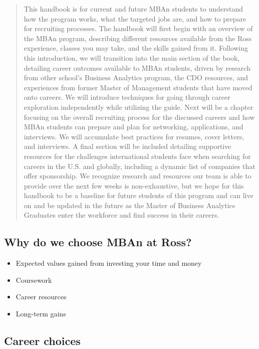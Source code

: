 \documentclass[
]{book}
\providecommand{\tightlist}{%
  \setlength{\itemsep}{0pt}\setlength{\parskip}{0pt}}
\begin{document}
\begin{quote}
This handbook is for current and future MBAn students to understand how the program works, what the targeted jobs are, and how to prepare for recruiting processes. The handbook will first begin with an overview of the MBAn program, describing different resources available from the Ross experience, classes you may take, and the skills gained from it. Following this introduction, we will transition into the main section of the book, detailing career outcomes available to MBAn students, driven by research from other school's Business Analytics program, the CDO resources, and experiences from former Master of Management students that have moved onto careers. We will introduce techniques for going through career exploration independently while utilizing the guide. Next will be a chapter focusing on the overall recruiting process for the discussed careers and how MBAn students can prepare and plan for networking, applications, and interviews. We will accumulate best practices for resumes, cover letters, and interviews. A final section will be included detailing supportive resources for the challenges international students face when searching for careers in the U.S. and globally, including a dynamic list of companies that offer sponsorship. We recognize research and resources our team is able to provide over the next few weeks is non-exhaustive, but we hope for this handbook to be a baseline for future students of this program and can live on and be updated in the future as the Master of Business Analytics Graduates enter the workforce and find success in their careers.
\end{quote}

\hypertarget{why-do-we-choose-mban-at-ross}{%
\subsection{Why do we choose MBAn at Ross?}\label{why-do-we-choose-mban-at-ross}}

\begin{itemize}
\tightlist
\item
  Expected values gained from investing your time and money
\item
  Coursework
\item
  Career resources
\item
  Long-term gains
\end{itemize}

\hypertarget{career-choices-1}{%
\subsection{Career choices}\label{career-choices-1}}
\end{document}
